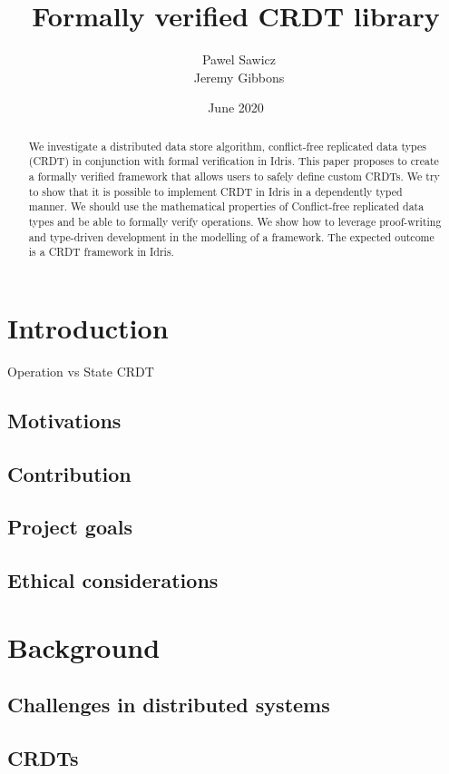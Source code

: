 \documentclass[dissertation]{softeng}
\title{Formally verified CRDT library}
\author{\ Pawel Sawicz \\ \ Jeremy Gibbons}
\date{June 2020}
\begin{document}
\maketitle

\begin{abstract}

We investigate a distributed data store algorithm, conflict-free replicated data types (CRDT) in conjunction with formal verification in Idris. This paper proposes to create a formally verified framework that allows users to safely define custom CRDTs. We try to show that it is possible to implement CRDT in Idris in a dependently typed manner. We should use the mathematical properties of Conflict-free replicated data types and be able to formally verify operations. We show how to leverage proof-writing and type-driven development in the modelling of a framework. The expected outcome is a CRDT framework in Idris.

\end{abstract}

\chapter{Introduction}
Operation vs State CRDT
\section{Motivations}
\section{Contribution}
\section{Project goals}
\section{Ethical considerations}

\newpage
\chapter{Background}
\section{Challenges in distributed systems}
\section{CRDTs}
\end{document}
